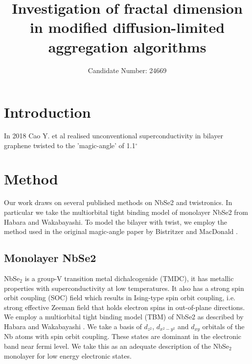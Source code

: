 \documentclass[10pt, twocolumn]{article} %
\title{\textbf{Investigation of fractal dimension in modified diffusion-limited aggregation algorithms}}
\author{Candidate Number: 24669}
\affil{Department of Physics, University of Bath, Bath BA2 7AY, United Kingdom}
\begin{document}
\medskip

\section*{Introduction}

  In 2018 Cao Y. et al\cite{Cao_2018} realised unconventional superconductivity in bilayer graphene twisted to the 'magic-angle' of 1.1$^\circ$ 


\section*{Method}
  Our work draws on several published methods on NbSe2 and twistronics. In particular we take the multiorbital tight binding model of monolayer NbSe2 from Habara and Wakabayashi\cite{Habara_2021}. To model the bilayer with twist, we employ the method used in the original magic-angle paper by Bistritzer and MacDonald \cite{Bistritzer_2011}. 

\subsection*{Monolayer NbSe2}
  NbSe$_2$ is a group-V transition metal dichalcogenide (TMDC), it has metallic properties with superconductivity at low temperatures. It also has a strong spin orbit coupling (SOC) field which results in Ising-type spin orbit coupling, i.e. strong effective Zeeman field that holds electron spins in out-of-plane directions. We employ a multiorbital tight binding model (TBM) of NbSe2 as described by Habara and Wakabayashi \cite{Habara_2021}. We take a basis of $d_{z^2}$, $d_{x^2 - y^2}$ and $d_{xy}$ orbitals of the Nb atoms with spin orbit coupling. These states are dominant in the electronic band near fermi level. We take this as an adequate description of the NbSe$_2$ monolayer for low energy electronic states.
\end{document}
